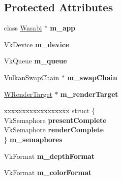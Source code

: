 \subsection*{Protected Attributes}
\begin{DoxyCompactItemize}
\item 
class \hyperlink{class_wasabi}{Wasabi} $\ast$ {\bfseries m\+\_\+app}\hypertarget{class_w_renderer_ad8e38cb218a41107827983eae756bc0d}{}\label{class_w_renderer_ad8e38cb218a41107827983eae756bc0d}

\item 
Vk\+Device {\bfseries m\+\_\+device}\hypertarget{class_w_renderer_a9ded5e9d4b590436819577e3c3bdc04f}{}\label{class_w_renderer_a9ded5e9d4b590436819577e3c3bdc04f}

\item 
Vk\+Queue {\bfseries m\+\_\+queue}\hypertarget{class_w_renderer_a650926342e781e8f89e20161f2701fb7}{}\label{class_w_renderer_a650926342e781e8f89e20161f2701fb7}

\item 
Vulkan\+Swap\+Chain $\ast$ {\bfseries m\+\_\+swap\+Chain}\hypertarget{class_w_renderer_a2d5cad7799d4155501b47a4bafba6ca6}{}\label{class_w_renderer_a2d5cad7799d4155501b47a4bafba6ca6}

\item 
\hyperlink{class_w_render_target}{W\+Render\+Target} $\ast$ {\bfseries m\+\_\+render\+Target}\hypertarget{class_w_renderer_a92bd84778cf6054f0ee5d0dbbc7cb78c}{}\label{class_w_renderer_a92bd84778cf6054f0ee5d0dbbc7cb78c}

\item 
\begin{tabbing}
xx\=xx\=xx\=xx\=xx\=xx\=xx\=xx\=xx\=\kill
struct \{\\
\>VkSemaphore {\bfseries presentComplete}\\
\>VkSemaphore {\bfseries renderComplete}\\
\} {\bfseries m\_semaphores}\hypertarget{class_w_renderer_abb89b6d172796e9b2cdbc2038572c09e}{}\label{class_w_renderer_abb89b6d172796e9b2cdbc2038572c09e}
\\

\end{tabbing}\item 
Vk\+Format {\bfseries m\+\_\+depth\+Format}\hypertarget{class_w_renderer_a096e989659820834d161474b7bd82179}{}\label{class_w_renderer_a096e989659820834d161474b7bd82179}

\item 
Vk\+Format {\bfseries m\+\_\+color\+Format}\hypertarget{class_w_renderer_a4278ba8532bba8d42411b78c4f6e5475}{}\label{class_w_renderer_a4278ba8532bba8d42411b78c4f6e5475}


\end{DoxyCompactItemize}
